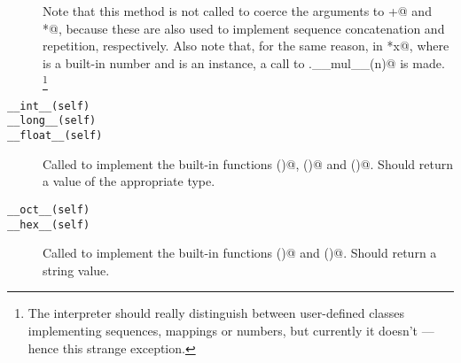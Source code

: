 \begin{description}
Note that this method is not called to coerce the arguments to \verb@+@
and \verb@*@, because these are also used to implement sequence
concatenation and repetition, respectively.  Also note that, for the
same reason, in \verb@n*x@, where \verb@n@ is a built-in number and
\verb@x@ is an instance, a call to \verb@x.__mul__(n)@ is made.%
\footnote{The interpreter should really distinguish between
user-defined classes implementing sequences, mappings or numbers, but
currently it doesn't --- hence this strange exception.}

\item[{\tt __int__(self)}]\itemjoin
\item[{\tt __long__(self)}]\itemjoin
\item[{\tt __float__(self)}]\itembreak
Called to implement the built-in functions \verb@int()@, \verb@long()@
and \verb@float()@.  Should return a value of the appropriate type.

\item[{\tt __oct__(self)}]\itemjoin
\item[{\tt __hex__(self)}]\itembreak
Called to implement the built-in functions \verb@oct()@ and
\verb@hex()@.  Should return a string value.

\end{description}

